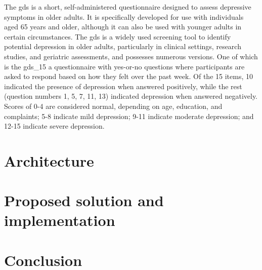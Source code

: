 \documentclass[a4paper,fleqn]{cas-dc}
\begin{document}
The \gls{gds} \cite{yesavage_development_1982} is a short, self-administered questionnaire designed to assess depressive symptoms in older adults. It is specifically developed for use with individuals aged 65 years and older, although it can also be used with younger adults in certain circumstances. The \gls{gds} is a widely used screening tool to identify potential depression in older adults, particularly in clinical settings, research studies, and geriatric assessments, and possesses numerous versions. One of which is the \gls{gds_15} a questionnaire with yes-or-no questions where participants are asked to respond based on how they felt over the past week.  Of the 15 items, 10 indicated the presence of depression when answered positively, while the rest (question numbers 1, 5, 7, 11, 13) indicated depression when answered negatively. Scores of 0-4 are considered normal, depending on age, education, and complaints; 5-8 indicate mild depression; 9-11 indicate moderate depression; and 12-15 indicate severe depression. 

\section{Architecture}
\label{architecture}

\section{Proposed solution and implementation}
\label{proposedSolution}

\section{Conclusion}
\label{conclusion}
\printcredits

%
%



\end{document}
